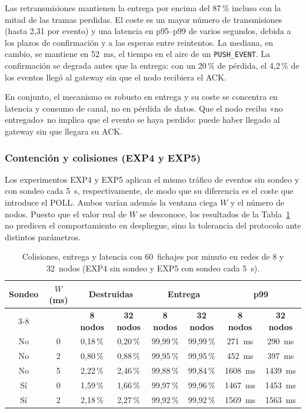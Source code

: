 Las retransmisiones mantienen la entrega por encima del 87\,\% incluso con la mitad de las tramas perdidas. El coste es un mayor número de transmisiones (hasta 2,31 por evento) y una latencia en p95--p99 de varios segundos, debida a los plazos de confirmación y a las esperas entre reintentos. La mediana, en cambio, se mantiene en 52~ms, el tiempo en el aire de un \texttt{PUSH\_EVENT}. La confirmación se degrada antes que la entrega: con un 20\,\% de pérdida, el 4,2\,\% de los eventos llegó al gateway sin que el nodo recibiera el ACK.

En conjunto, el mecanismo es robusto en entrega y su coste se concentra en latencia y consumo de canal, no en pérdida de datos. Que el nodo reciba «no entregado» no implica que el evento se haya perdido: puede haber llegado al gateway sin que llegara su ACK.

\subsubsection{Contención y colisiones (EXP4 y EXP5)}\label{sec:contencion}

Los experimentos EXP4 y EXP5 aplican el mismo tráfico de eventos sin sondeo y con sondeo cada 5~s, respectivamente, de modo que su diferencia es el coste que introduce el POLL. Ambos varían además la ventana ciega $W$ y el número de nodos. Puesto que el valor real de $W$ se desconoce, los resultados de la Tabla~\ref{tab:contencion} no predicen el comportamiento en despliegue, sino la tolerancia del protocolo ante distintos parámetros.

\begin{table}[H]
\centering
\caption{\label{tab:contencion} Colisiones, entrega y latencia con 60~fichajes por minuto en redes de 8 y 32~nodos (EXP4 sin sondeo y EXP5 con sondeo cada 5~s).}
\small
\setlength{\tabcolsep}{4pt}
\begin{tabular}{|c|c|c|c|c|c|c|c|}
\hline
\multirow{2}{*}{\textbf{Sondeo}} & \multirow{2}{*}{\textbf{$W$ (ms)}} & \multicolumn{2}{c|}{\textbf{Destruidas}} & \multicolumn{2}{c|}{\textbf{Entrega}} & \multicolumn{2}{c|}{\textbf{p99}} \\
\cline{3-8}
 & & \textbf{8 nodos} & \textbf{32 nodos} & \textbf{8 nodos} & \textbf{32 nodos} & \textbf{8 nodos} & \textbf{32 nodos} \\
\hline
No & 0 & 0,18\,\% & 0,20\,\% & 99,99\,\% & 99,99\,\% & 271~ms  & 290~ms \\
\hline
No & 2 & 0,80\,\% & 0,88\,\% & 99,95\,\% & 99,95\,\% & 452~ms  & 397~ms \\
\hline
No & 5 & 2,22\,\% & 2,46\,\% & 99,88\,\% & 99,84\,\% & 1608~ms & 1439~ms \\
\hline
Sí & 0 & 1,59\,\% & 1,66\,\% & 99,97\,\% & 99,96\,\% & 1467~ms & 1453~ms \\
\hline
Sí & 2 & 2,18\,\% & 2,27\,\% & 99,92\,\% & 99,92\,\% & 1569~ms & 1563~ms \\
\hline
\end{tabular}
\end{table}

